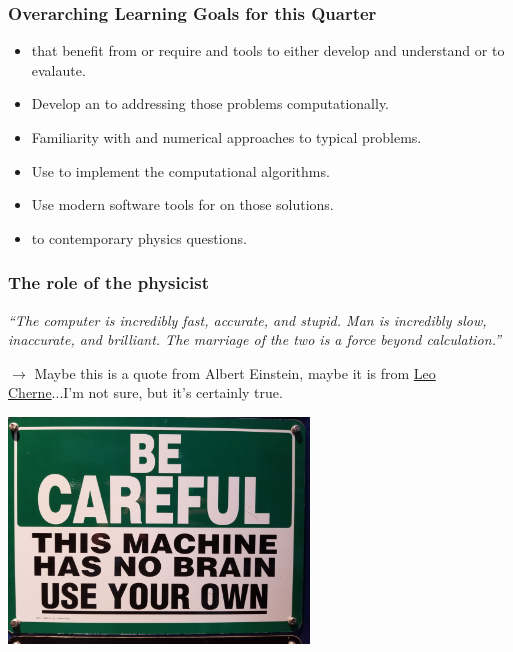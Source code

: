 \documentclass[hyperref={colorlinks=true}]{beamer}
\begin{document}

\begin{frame}%
  \frametitle{Overarching Learning Goals for this Quarter}

  \begin{itemize}
    \item {} that benefit from or require  and tools to either develop and understand or to evalaute. 
    \item Develop an  to addressing those problems computationally.
    \item Familiarity with  and numerical approaches to typical problems.
    \item Use  to implement the computational algorithms. 
    \item Use modern software tools for  on those solutions.
    \item {} to contemporary physics questions.
  \end{itemize}
  
\end{frame}


\begin{frame}%
  \frametitle{The role of the physicist}

  \textit{``The computer is incredibly fast, accurate, and stupid. Man is incredibly slow, inaccurate, and brilliant. The marriage of the two is a force beyond calculation.''}
  
  \vspace{0.4cm}
  
  $\rightarrow$ Maybe this is a quote from Albert Einstein, maybe it is from \href{https://en.wikipedia.org/wiki/Leo\_Cherne}{Leo Cherne}...I'm not sure, but it's certainly true.
  
  \centering
  \includegraphics[width=0.6\textwidth]{MachineBrain.jpg}
  
\end{frame}
\end{document}

